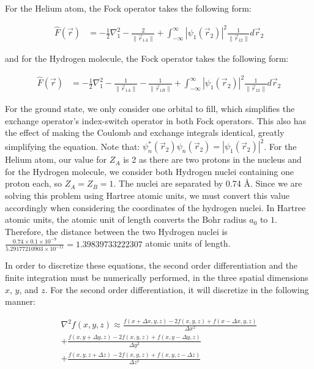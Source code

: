 \documentclass[10pt, oneside, letterpaper]{article}
\newcommand{\angstrom}{\textup{\AA}} %
\begin{document}
For the Helium atom, the Fock operator takes the following form:

\begin{align*}
  \hat{F}(\vec{r}) &= -\frac{1}{2}\nabla_1^2 - \frac{2}{\|\vec{r}_{1 A}\|} + \int_{-\infty}^{\infty}\left|\psi_1(\vec{r}_2)\right|^2\frac{1}{\|\vec{r}_{12}\|}d\vec{r}_2
\end{align*}

and for the Hydrogen molecule, the Fock operator takes the following form:

\begin{align*}
  \hat{F}(\vec{r}) &= -\frac{1}{2}\nabla_1^2 - \frac{1}{\|\vec{r}_{1 A}\|} - \frac{1}{\|\vec{r}_{1 B}\|} + \int_{-\infty}^{\infty}\left|\psi_1(\vec{r}_2)\right|^2\frac{1}{\|\vec{r}_{12}\|}d\vec{r}_2
\end{align*}

For the ground state, we only consider one orbital to fill, which simplifies the exchange operator's index-switch operator in both Fock operators. This also has the effect of making the Coulomb and exchange integrals identical, greatly simplifying the equation. Note that: $\psi_n^\ast(\vec{r}_2)\psi_n(\vec{r}_2) = \left|\psi_1(\vec{r}_2)\right|^2$. For the Helium atom, our value for $Z_A$ is 2 as there are two protons in the nucleus and for the Hydrogen molecule, we consider both Hydrogen nuclei containing one proton each, so $Z_A = Z_B = 1$. The nuclei are separated by 0.74 \angstrom. Since we are solving this problem using Hartree atomic units, we must convert this value accordingly when considering the coordinates of the hydrogen nuclei. In Hartree atomic units, the atomic unit of length converts the Bohr radius $a_0$ to $1$. Therefore, the distance between the two Hydrogen nuclei is $\frac{0.74 \times 0.1\times10^{-9}}{5.29177210903\times10^{-11}} = 1.39839733222307$ atomic units of length.

In order to discretize these equations, the second order differentiation and the finite integration must be numerically performed, in the three spatial dimensions $x$, $y$, and $z$. For the second order differentiation, it will discretize in the following manner:

\begin{align*}
  \nabla^2f(x, y, z) \approx \frac{f(x + \Delta x,y,z) - 2f(x, y, z) + f(x - \Delta x,y,z)}{\Delta x^2}\\
  + \frac{f(x,y + \Delta y,z) - 2f(x, y, z) + f(x,y - \Delta y,z)}{\Delta y^2}\\
  + \frac{f(x,y,z + \Delta z) - 2f(x, y, z) + f(x,y,z - \Delta z)}{\Delta z^2}
\end{align*}
\end{document}
